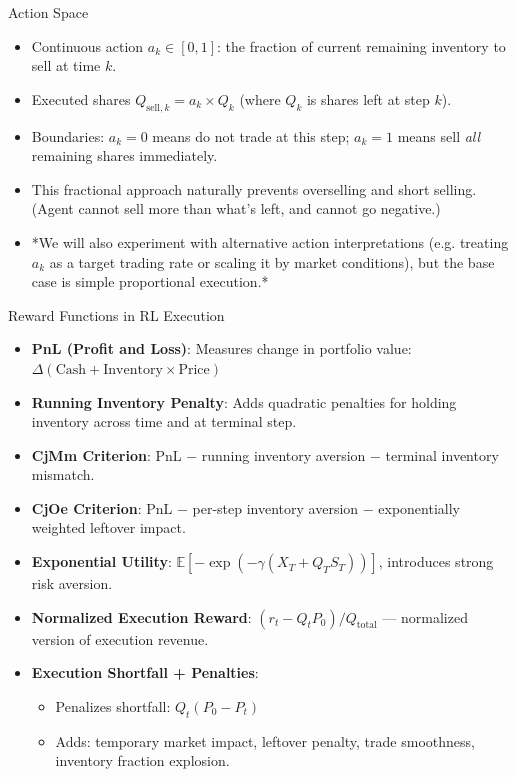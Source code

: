 \documentclass[11pt,aspectratio=169]{beamer}   %
\begin{document}
\begin{frame}{Action Space}
	\begin{itemize}
		\item Continuous action $a_k \in [0,1]$: the fraction of current remaining inventory to sell at time $k$.
		\item Executed shares $Q_{\text{sell},k} = a_k \times Q_k$ (where $Q_k$ is shares left at step $k$). 
		\item Boundaries: $a_k=0$ means do not trade at this step; $a_k=1$ means sell \textit{all} remaining shares immediately.
		\item This fractional approach naturally prevents overselling and short selling. (Agent cannot sell more than what’s left, and cannot go negative.)
		\item *We will also experiment with alternative action interpretations (e.g. treating $a_k$ as a target trading rate or scaling it by market conditions), but the base case is simple proportional execution.*
	\end{itemize}
\end{frame}

\begin{frame}{Reward Functions in RL Execution}
	\begin{itemize}
		\item \textbf{PnL (Profit and Loss)}: Measures change in portfolio value: $\Delta(\text{Cash} + \text{Inventory} \times \text{Price})$
		\item \textbf{Running Inventory Penalty}: Adds quadratic penalties for holding inventory across time and at terminal step.
		\item \textbf{CjMm Criterion}: PnL $-$ running inventory aversion $-$ terminal inventory mismatch.
		\item \textbf{CjOe Criterion}: PnL $-$ per-step inventory aversion $-$ exponentially weighted leftover impact.
		\item \textbf{Exponential Utility}: $\mathbb{E}[-\exp(-\gamma (X_T + Q_T S_T))]$, introduces strong risk aversion.
		\item \textbf{Normalized Execution Reward}: $(r_t - Q_t P_0) / Q_{\text{total}}$ — normalized version of execution revenue.
		\item \textbf{Execution Shortfall + Penalties}:
		\begin{itemize}
			\item Penalizes shortfall: $Q_t (P_0 - P_t)$
			\item Adds: temporary market impact, leftover penalty, trade smoothness, inventory fraction explosion.
		\end{itemize}
	\end{itemize}
\end{frame}
\end{document}
